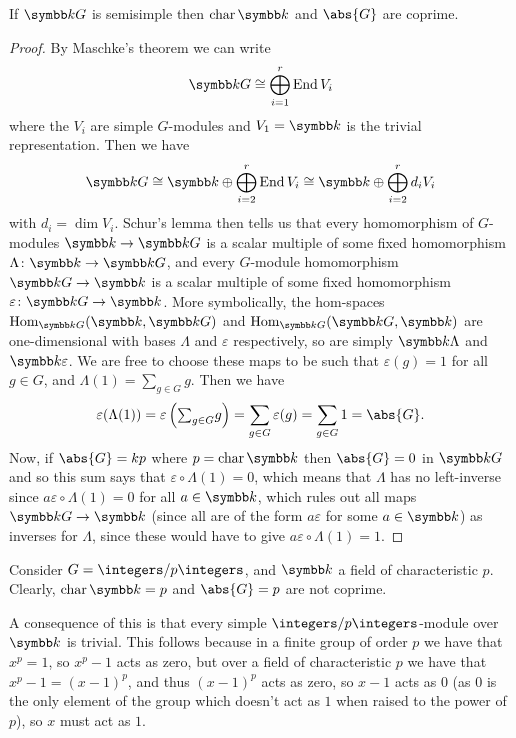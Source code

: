 \begin{prp}{}{}
    If \(\field G\) is semisimple then \(\Char \field\) and \(\abs{G}\) are coprime.
    \begin{proof}
        By Maschke's theorem we can write
        \begin{equation}
            \field G \isomorphic \bigoplus_{i=1}^r \End V_i
        \end{equation}
        where the \(V_i\) are simple \(G\)-modules and \(V_1 = \field\) is the trivial representation.
        Then we have
        \begin{equation}
            \field G \isomorphic \field \oplus \bigoplus_{i=2}^r \End V_i \isomorphic \field \oplus \bigoplus_{i=2}^r d_i V_i
        \end{equation}
        with \(d_i = \dim V_i\).
        Schur's lemma then tells us that every homomorphism of \(G\)-modules \(\field \to \field G\) is a scalar multiple of some fixed homomorphism \(\Lambda \colon \field \to \field G\), and every \(G\)-module homomorphism \(\field G \to \field\) is a scalar multiple of some fixed homomorphism \(\varepsilon \colon \field G \to \field\).
        More symbolically, the hom-spaces \(\Hom_{\field G}(\field, \field G)\) and \(\Hom_{\field G}(\field G, \field)\) are one-dimensional with bases \(\Lambda\) and \(\varepsilon\) respectively, so are simply \(\field \Lambda\) and \(\field \varepsilon\).
        We are free to choose these maps to be such that \(\varepsilon(g) = 1\) for all \(g \in G\), and \(\Lambda(1) = \sum_{g \in G} g\).
        Then we have
        \begin{equation}
            \varepsilon(\Lambda(1)) = \varepsilon\left( {\textstyle \sum_{g \in G}} g \right) = \sum_{g \in G} \varepsilon(g) = \sum_{g \in G} 1 = \abs{G}.
        \end{equation}
        Now, if \(\abs{G} = kp\) where \(p = \Char \field\) then \(\abs{G} = 0\) in \(\field G\) and so this sum says that \(\varepsilon \circ \Lambda(1) = 0\), which means that \(\Lambda\) has no left-inverse since \(a \varepsilon \circ \Lambda(1) = 0\) for all \(a \in \field\), which rules out all maps \(\field G \to \field\) (since all are of the form \(a\varepsilon\) for some \(a \in \field\)) as inverses for \(\Lambda\), since these would have to give \(a \varepsilon \circ \Lambda(1) = 1\).
    \end{proof}
\end{prp}

\begin{exm}{}{}
    Consider \(G = \integers/p\integers\), and \(\field\) a field of characteristic \(p\).
    Clearly, \(\Char \field = p\) and \(\abs{G} = p\) are not coprime.
    
    A consequence of this is that every simple \(\integers/p\integers\)-module over \(\field\) is trivial.
    This follows because in a finite group of order \(p\) we have that \(x^p = 1\), so \(x^p - 1\) acts as zero, but over a field of characteristic \(p\) we have that \(x^p - 1 = (x - 1)^p\), and thus \((x - 1)^p\) acts as zero, so \(x - 1\) acts as \(0\) (as \(0\) is the only element of the group which doesn't act as \(1\) when raised to the power of \(p\)), so \(x\) must act as \(1\).
\end{exm}

